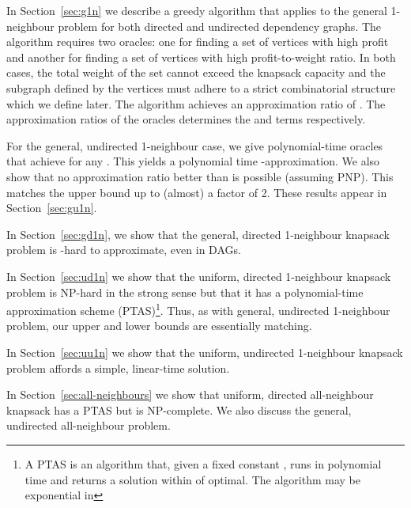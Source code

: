 \documentclass[12pt]{article}
\begin{document}
In Section~\ref{sec:g1n} we describe a greedy algorithm that applies to the general 1-neighbour problem for both directed and undirected dependency graphs.  The algorithm requires two oracles: one for finding a set of vertices with high profit and another for finding a set of vertices with high profit-to-weight ratio.  In both cases, the total weight of the set cannot exceed the knapsack capacity and the subgraph defined by the vertices must adhere to a strict combinatorial structure which we define later.   The algorithm achieves an approximation ratio of .  The approximation ratios of the oracles determines the  and  terms respectively.

For the general, undirected 1-neighbour case, we give polynomial-time oracles that achieve  for any .  This yields a polynomial time -approximation.  We also show that no approximation ratio better than  is possible (assuming PNP).  This matches the upper bound up to (almost) a factor of 2.  These results appear in Section~\ref{sec:gu1n}.

In Section~\ref{sec:gd1n}, we show that the general, directed 1-neighbour knapsack problem is -hard to approximate, even in DAGs.  

In Section~\ref{sec:ud1n} we show that the uniform, directed
1-neighbour knapsack problem is NP-hard in the strong sense but that it has a polynomial-time
approximation scheme (PTAS)\footnote{A PTAS is an algorithm that,
given a fixed constant , runs in polynomial time and
returns a solution within  of optimal.  The algorithm
may be exponential in }.  Thus, as with general, undirected 1-neighbour problem, our upper and lower bounds are essentially matching.

In Section~\ref{sec:uu1n} we show that the uniform, undirected
1-neighbour knapsack problem affords a simple, linear-time solution.

In Section~\ref{sec:all-neighbours} we show that uniform, directed
all-neighbour knapsack has a PTAS but is NP-complete.  We also discuss the general, undirected all-neighbour problem.
\end{document}
